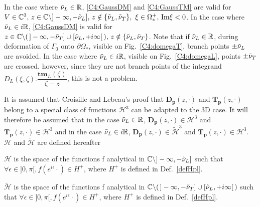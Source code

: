 In the case where $\tilde{\nu}_L \in \mathbb{R}$, \eqref{C4:GaussDM} and \eqref{C4:GaussTM} are valid for $V \in \mathbb{C}^3, \, z\in \mathbb{C} \backslash  \rbrack - \infty, -\tilde{\nu}_L \rbrack , \,  z \notin \{\tilde{\nu}_L,\tilde{\nu}_T \}, \, \, \xi \in \Omega_*^+, \, \mbox{Im} \xi <0 $. In the case where $\tilde{\nu}_L \in i\mathbb{R}$, \eqref{C4:GaussDM}  is valid for $ z\in \mathbb{C} \backslash ( \, \rbrack - \infty, -\tilde{\nu}_T \rbrack \cup \lbrack \tilde{\nu}_L,+i\infty \lbrack \,), \,  z \notin \{\tilde{\nu}_L,\tilde{\nu}_T \}$. Note that if $\tilde{\nu}_L \in \mathbb{R}$, during deformation of $\Gamma_0$ onto $\partial \Omega_*$, visible on Fig.~\ref{C4:domegaT}, branch points $\pm \tilde{\nu}_L$ are avoided. In the case where $\tilde{\nu}_L \in i\mathbb{R}$, visible on Fig.~\ref{C4:domegaL}, points $\pm \tilde{\nu}_T$ are crossed. however, since they are not branch points of the integrand $D_L(\xi,\zeta).\dfrac{\mathbf{tm}_L(\zeta)}{\zeta-z}$, this is not a problem.

It is assumed that Croisille and Lebeau's \cite{CroisilleLebeau} proof that $\mathbf{D_p}(z,\cdot)$ and $\mathbf{T_p}(z,\cdot)$ belong to a special class of functions $\mathcal{H}^3$ can be adapted to the 3D case. It will therefore be assumed that in the case $\tilde{\nu}_L \in \mathbb{R}$, $\mathbf{D_p}(z,\cdot) \in \mathcal{H}^3$ and $\mathbf{T_p}(z,\cdot) \in \mathcal{H}^3$ and in the case $\tilde{\nu}_L \in i\mathbb{R}$, $\mathbf{D_p}(z,\cdot) \in \tilde{\mathcal{H}}^3$ and $\mathbf{T_p}(z,\cdot) \in \mathcal{H}^3$. $\mathcal{H}$ and $\tilde{\mathcal{H}}$ are defined hereafter
\begin{definition}
\label{C4:defH}
$\mathcal{H}$ is the space of the functions f analytical in $\mathbb{C}\backslash \rbrack -\infty,-\tilde{\nu}_L\rbrack$ such that $\forall \epsilon \in \rbrack0,\pi \lbrack, f(e^{i\epsilon} \cdot)\in H^+$, where $H^+$ is defined in Def.~\ref{defHpl}.
\end{definition}
\begin{definition}
\label{C4:defHcrit}
$\tilde{\mathcal{H}}$ is the space of the functions f analytical in  $\mathbb{C} \backslash ( \, \rbrack - \infty, -\tilde{\nu}_T \rbrack \cup \lbrack \tilde{\nu}_L,+i\infty \lbrack \,)$ such that $\forall \epsilon \in \rbrack0,\pi \lbrack, f(e^{i\epsilon} \cdot)\in H^+$, where $H^+$ is defined in Def.~\ref{defHpl}.
\end{definition}

